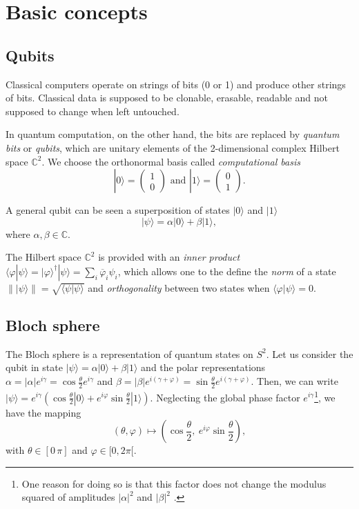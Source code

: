 \documentclass[a4paper, 10pt]{article}
\numberwithin{equation}{section}
\numberwithin{figure}{section}
\numberwithin{table}{section}
\begin{document}
\newpage
\section{Basic concepts}

\subsection{Qubits}
Classical computers operate on strings of bits (0 or 1) and produce other strings of bits. Classical data is supposed to be clonable, erasable, readable and not supposed to change when left untouched.

In quantum computation, on the other hand, the bits are replaced by \textit{quantum bits} or \textit{qubits}, which are unitary elements of the 2-dimensional complex Hilbert space $\mathbb{C}^2$. We choose the orthonormal basis called \textit{computational basis}
$$ |0\rangle = \begin{pmatrix} 1 \\0 \end{pmatrix} \text{ and } |1 \rangle = \begin{pmatrix} 0 \\1 \end{pmatrix}. $$

A general qubit can be seen a superposition of states $|0\rangle$ and $|1\rangle$
\begin{equation}
	|\psi\rangle = \alpha|0\rangle + \beta|1\rangle,
\end{equation}
where $\alpha,\beta\in\mathbb{C}$.

The Hilbert space $\mathbb{C}^2$ is provided with an \textit{inner product} $\langle\varphi|\psi\rangle = {|\varphi\rangle}^{\dagger}|\psi\rangle = \sum_i\overline{\varphi}_i\psi_i$, which allows one to the define the \textit{norm} of a state $\||\psi\rangle\|=\sqrt{\langle\psi|\psi\rangle}$ and \textit{orthogonality} between two states when $\langle\varphi|\psi\rangle=0$.

\subsection{Bloch sphere}
The Bloch sphere is a representation of quantum states on $S^2$. Let us consider the qubit in state $|\psi\rangle = \alpha|0\rangle + \beta|1\rangle$ and the polar representations $\alpha=|\alpha|e^{i\gamma}=\cos\frac{\theta}{2}e^{i\gamma}$ and $\beta=|\beta|e^{i(\gamma+\varphi)}=\sin\frac{\theta}{2}e^{i(\gamma+\varphi)}$. Then, we can write $|\psi\rangle=e^{i\gamma}\left(\cos\frac{\theta}{2}|0\rangle+e^{i\varphi}\sin\frac{\theta}{2}|1\rangle\right)$. Neglecting the global phase factor $e^{i\gamma}$\footnote{One reason for doing so is that this factor does not change the modulus squared of amplitudes $|\alpha|^2$ and $|\beta|^2$ \cite{portugal}.}, we have the mapping
\begin{equation}
	(\theta,\varphi) \mapsto \left(\cos\frac{\theta}{2},\ e^{i\varphi}\sin\frac{\theta}{2}\right),
\end{equation}
with $\theta\in[0\,\pi]$ and $\varphi\in[0,2\pi[$.
\end{document}
